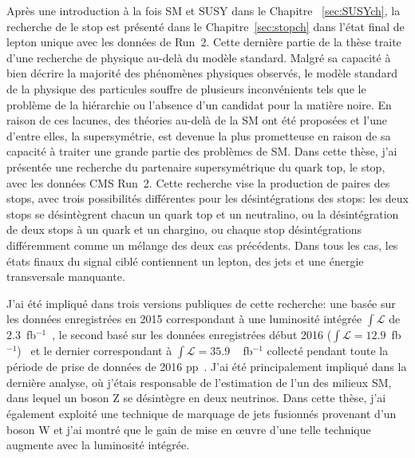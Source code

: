 Après une introduction à la fois SM et SUSY dans le Chapitre ~\ref{sec:SUSYch}, la recherche de le stop est présenté dans le Chapitre~\ref{sec:stopch} dans l'état final de lepton unique avec les données de Run~2. Cette dernière partie de la thèse traite d'une recherche de physique au-delà du modèle standard. Malgré sa capacité à bien décrire la majorité des phénomènes physiques observés, le modèle standard de la physique des particules souffre de plusieurs inconvénients tels que le problème de la hiérarchie ou l’absence d’un candidat pour la matière noire. En raison de ces lacunes, des théories au-delà de la SM ont été proposées et l'une d'entre elles, la supersymétrie, est devenue la plus prometteuse en raison de sa capacité à traiter une grande partie des problèmes de SM. Dans cette thèse, j'ai présentée une recherche du partenaire supersymétrique du quark top, le stop, avec les données CMS Run~2. Cette recherche vise la production de paires des stops, avec trois possibilités différentes pour les désintégrations des stops: les deux stops se désintègrent chacun un quark top et un neutralino, ou la désintégration de deux stops à un quark et un chargino, ou chaque stop désintégrations différemment comme un mélange des deux cas précédents. Dans tous les cas, les états finaux du signal ciblé contiennent un lepton, des jets et une énergie transversale manquante.


J'ai été impliqué dans trois versions publiques de cette recherche: une basée sur les données enregistrées en 2015 correspondant à une luminosité intégrée $\int{\mathcal{L}} $ de 2.3~fb$^{-1}$~\cite{Sirunyan:2016jpr}, le second basé sur les données enregistrées début 2016 ($\int{\mathcal {L}} = 12.9 $~fb$^{-1} $)~\cite{CMS:2016vew} et le dernier correspondant à $ \int{\mathcal {L}} = 35.9 $ ~ fb$^{-1} $ collecté pendant toute la période de prise de données de 2016 pp~\cite{Sirunyan:2017xse}. J'ai été principalement impliqué dans la dernière analyse, où j'étais responsable de l'estimation de l'un des milieux SM, dans lequel un boson Z se désintègre en deux neutrinos. Dans cette thèse, j'ai également exploité une technique de marquage de jets fusionnés provenant d'un boson W et j'ai montré que le gain de mise en œuvre d'une telle technique augmente avec la luminosité intégrée.

